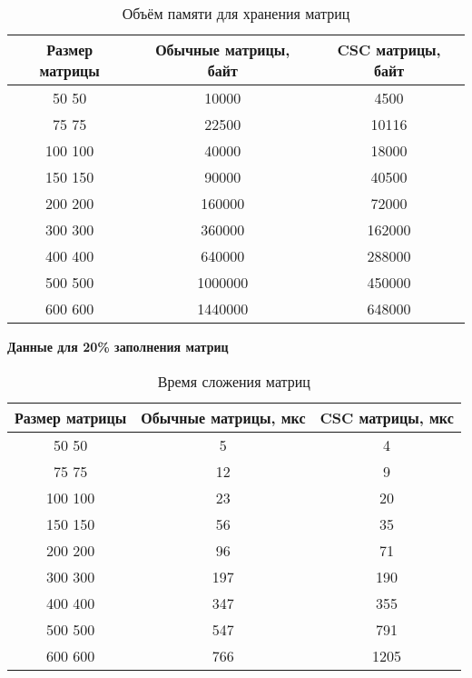 \begin{table}[H]
	\centering
	\caption{Объём памяти для хранения матриц}
	\begin{tabular}{|c|c|c|}
		\hline
		Размер матрицы & Обычные матрицы, байт & CSC матрицы, байт \\ \hline
		50  50         & 10000                 & 4500             \\ \hline
		75  75         & 22500                 & 10116             \\ \hline
		100 100        & 40000                 & 18000             \\ \hline
		150 150        & 90000                 & 40500            \\ \hline
		200 200        & 160000                & 72000            \\ \hline
		300 300        & 360000                & 162000            \\ \hline
		400 400        & 640000                & 288000            \\ \hline
		500 500        & 1000000               & 450000           \\ \hline
		600 600        & 1440000               & 648000           \\ \hline
	\end{tabular}
\end{table}

\newpage
\textbf{Данные для 20\% заполнения матриц}
\begin{table}[H]
	\centering
	\caption{Время сложения матриц}
	\begin{tabular}{|c|c|c|}
		\hline
		Размер матрицы & Обычные матрицы, мкс & CSC матрицы, мкс \\ \hline
		50  50         & 5                    & 4                \\ \hline
		75  75         & 12                   & 9                \\ \hline
		100 100        & 23                   & 20                \\ \hline
		150 150        & 56                   & 35               \\ \hline
		200 200        & 96                   & 71               \\ \hline
		300 300        & 197                  & 190               \\ \hline
		400 400        & 347                  & 355              \\ \hline
		500 500        & 547                  & 791              \\ \hline
		600 600        & 766                  & 1205              \\ \hline
	\end{tabular}
\end{table}

